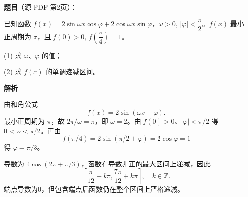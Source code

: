 \begin{answer}

\textbf{题目}（源 PDF 第2页）：

已知函数 \(f(x)=2\sin\omega x\cos\varphi+2\cos\omega x\sin\varphi\)，\(\omega>0,\ \lvert\varphi\rvert<\dfrac{\pi}{2}\)。\(f(x)\) 最小正周期为 \(\pi\)，且 \(f(0)>0,\ f\left(\dfrac{\pi}{4}\right)=1\)。

(1) 求 \(\omega、\varphi\) 的值；

(2) 求 \(f(x)\) 的单调递减区间。

\textbf{解析}


由和角公式
\nopagebreak[4]
\[
f(x)=2\sin(\omega x+\varphi).
\]
最小正周期为 \(\pi\)，故 \(2\pi/\omega=\pi\)，即 \(\omega=2\)。由 \(f(0)>0\)、\(|\varphi|<\pi/2\) 得 \(0<\varphi<\pi/2\)。再由
\nopagebreak[4]
\[
f(\pi/4)=2\sin(\pi/2+\varphi)=2\cos\varphi=1
\]
得 \(\varphi=\pi/3\)。


导数为 \(4\cos(2x+\pi/3)\)，函数在导数非正的最大区间上递减，因此
\nopagebreak[4]
\[
\left[\frac\pi{12}+k\pi,\frac{7\pi}{12}+k\pi\right],\quad k\in\mathbb Z.
\]
端点导数为0，但包含端点后函数仍在整个区间上严格递减。



\end{answer}
